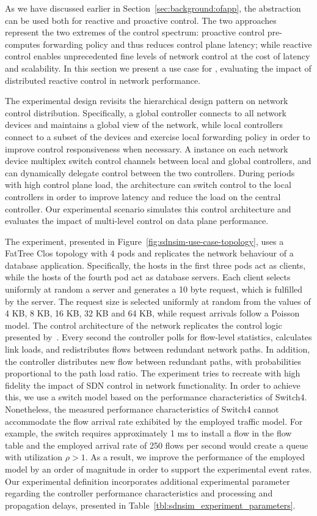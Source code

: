 As we have discussed earlier in Section~\ref{sec:background:ofapp}, the \of
abstraction can be used both for reactive and proactive control.  The two
approaches represent the two extremes of the control spectrum: proactive
control pre-computes forwarding policy and thus reduces control plane latency;
while reactive control enables unprecedented fine levels of network control at
the cost of latency and scalability.  In this section we present a use case for
\sdnsim, evaluating the impact of distributed reactive control in network
performance. 

The experimental design revisits the hierarchical design pattern on network
control distribution. Specifically, a global controller connects to all network
devices and maintains a global view of the network, while local controllers
connect to a subset of the devices and exercise local forwarding policy in
order to improve control responsiveness when necessary. A \flv instance on each
network device multiplex switch control channels between local and global
controllers, and can dynamically delegate control between the two controllers.
During periods with high control plane load, the architecture can switch
control to the local controllers in order to improve latency and reduce the
load on the central controller.  Our experimental scenario simulates this control
architecture and evaluates the impact of multi-level control on 
data plane performance.

The experiment, presented in Figure~\ref{fig:sdnsim-use-case-topology}, uses a
FatTree Clos topology with 4 pods and replicates the network behaviour of a
database application. Specifically,  the hosts in the first three pods act as
clients, while the hosts of the fourth pod act as database servers. Each client
selects uniformly at random a server  and generates a 10 byte request, which is
fulfilled by the server. The request size is selected uniformly at random from
the values of 4 KB, 8 KB, 16 KB, 32 KB and 64 KB\@, while request arrivals
follow a Poisson model. The control architecture of the network replicates the
control logic presented by~.  Every second the controller
polls for flow-level statistics, calculates link loads, and redistributes flows
between redundant network paths. In addition, the controller distributes new
flow between redundant paths, with probabilities proportional to the path load
ratio. The experiment tries to recreate with high fidelity the impact of SDN
control in network functionality. In order to achieve this, we use a switch
model based on  the performance characteristics of Switch4. Nonetheless, the
measured performance characteristics of Switch4 cannot accommodate the flow
arrival rate exhibited by the employed traffic model. For example, the switch
requires approximately 1 ms to install a flow in the flow table and the
employed arrival rate of 250 flows per second would create a queue with
utilization $\rho>1$. As a result, we improve the performance of the employed
model by an order of magnitude in order to support the experimental event
rates. Our experimental definition incorporates additional experimental
parameter regarding the controller performance characteristics and processing
and propagation delays, presented in
Table~\ref{tbl:sdnsim_experiment_parameters}.

